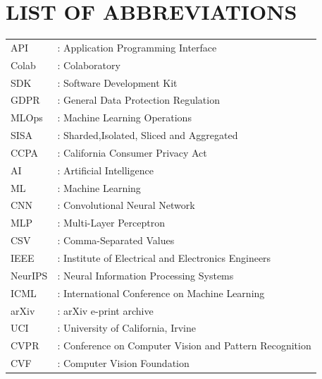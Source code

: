 \newpage
\chapter*{\textbf{LIST OF ABBREVIATIONS}}
\begin{tabular}{l l}
API	&	:	Application Programming Interface	\\
Colab	&	:	Colaboratory	\\
SDK  & : Software Development Kit \\
GDPR & : General Data Protection Regulation\\
MLOps & : Machine Learning Operations\\
SISA & :  Sharded,Isolated, Sliced and  Aggregated\\
CCPA & : California Consumer Privacy Act\\
AI  & : Artificial Intelligence\\
ML  & : Machine Learning\\
CNN & : Convolutional Neural Network\\
MLP & : Multi-Layer Perceptron\\
CSV & : Comma-Separated Values\\
IEEE & : Institute of Electrical and Electronics Engineers\\
NeurIPS & : Neural Information Processing Systems\\
ICML & : International Conference on Machine Learning\\
arXiv & : arXiv e-print archive\\
UCI & : University of California, Irvine\\
CVPR & : Conference on Computer Vision and Pattern Recognition\\
CVF  & : Computer Vision Foundation



\end{tabular}








